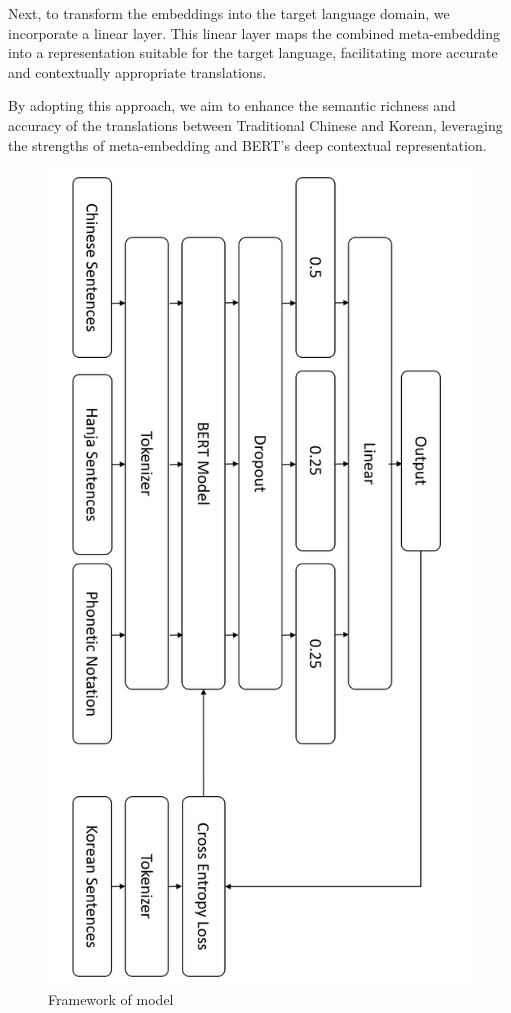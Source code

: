 \documentclass[PhD]{PHlab-thesis}
\begin{document}
Next, to transform the embeddings into the target language domain, we incorporate a linear layer. This linear layer maps the combined meta-embedding into a representation suitable for the target language, facilitating more accurate and contextually appropriate translations.

By adopting this approach, we aim to enhance the semantic richness and accuracy of the translations between Traditional Chinese and Korean, leveraging the strengths of meta-embedding and BERT's deep contextual representation.

\begin{figure}[h!]
  \centering
  \includegraphics[width=0.75\linewidth]{fig_3_framework.jpg}
  \captionsetup{type=figure}
  \caption{Framework of model}
  \label{fig:framwork}
\end{figure}
\end{document}
